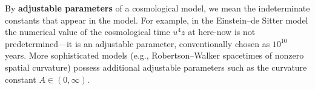 By \textbf{adjustable parameters} of a cosmological model, we mean the indeterminate constants that appear in the model. For example, in the Einstein--de Sitter model the numerical value of the cosmological time $u^4 z$ at here-now is not predetermined---it is an adjustable parameter, conventionally chosen as $10^{10}$ years. More sophisticated models (e.g., Robertson--Walker spacetimes of nonzero spatial curvature) possess additional adjustable parameters such as the curvature constant $A \in (0, \infty)$.
